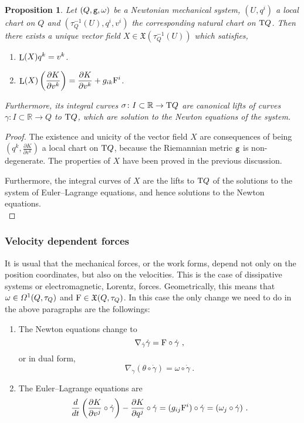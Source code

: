 \documentclass[12pt]{report}
\newtheorem{prop}[teor]{Proposition}
\def\ben{\begin{enumerate}}
\def\een{\end{enumerate}}
\def\dst{\displaystyle}
\def\derpar#1#2{\frac{\partial{#1}}{\partial{#2}}}
\def\qed{\ifvmode\removelastskip\fi
{\unskip\nobreak\hfil\penalty50\hbox{}\nobreak\hfil
\hbox{\vrule height1.2ex width1.2ex}\parfillskip=0pt
\finalhyphendemerits=0 \par\smallskip}}
\def\vf{\mathfrak X}
\def\df{{\mit\Omega}}
\def\Real{\mathbb{R}}
\def\Tan{{\rm T}}
\def\Lie{\mathop{\rm L}\nolimits}
\begin{document}
\begin{prop}
Let $(Q,{\tt g},\omega)$ be a Newtonian mechanical system, $(U,q^i)$ a local chart on $Q$ and $(\tau_Q^{-1}(U), q^i,v^i)$ the corresponding natural chart on $\Tan Q$.
Then there exists a unique vector field $X\in\vf(\tau_Q^{-1}(U))$
which satisfies,
\ben
\item
$\Lie(X)q^k=v^k$.
\item
\(\dst \Lie(X)\left(\derpar{K}{v^k}\right) =
\derpar{K}{v^k}+g_{ik}{\rm F}^i\).
\een
Furthermore, its integral curves $\sigma\colon I\subset\Real\to \Tan Q$
 are canonical lifts  of curves
$\gamma\colon I\subset\Real\to Q$ to $\Tan Q$, 
which are solution to the Newton equations of the system.
\label{cvXY}
\end{prop}
\begin{proof}
The existence and unicity of the vector field  $X$ are consequences of being
\(\dst\left( q^k,\derpar{K}{v^k}\right)\) a local chart on $\Tan Q$,
because the Riemannian metric ${\tt g}$ is non-degenerate.
The properties of  $X$ have been proved in the previous discussion.

Furthermore, the integral curves of $X$ are the lifts to $\Tan Q$ of the solutions to the system of Euler--Lagrange equations, 
and hence solutions to the Newton equations.
\\ \qed \end{proof}


\subsubsection{Velocity dependent forces}
\label{vdf}


It is usual that the mechanical forces, or the work forms, depend 
not only on the position coordinates, but also on the velocities. 
This is the case of dissipative systems or electromagnetic, Lorentz, forces. 
Geometrically, this means that 
$\omega\in\df^1(Q,\tau_Q)$ and ${\rm F}\in\vf (Q,\tau_Q)$. 
In this case the only change we need to do in the above paragraphs are the followings:
\ben
\item
The Newton equations change to
$$
\nabla_{\dot\gamma}\dot\gamma={\rm F}\circ\dot\gamma \ ,
$$
or in dual form,
$$
\nabla_{\dot\gamma}(\theta\circ\dot\gamma)=\omega\circ\dot\gamma \ .
$$
\item
The Euler--Lagrange equations are
$$
\frac{d}{d t}\left(\derpar{K}{v^j}\circ\dot\gamma\right)-
\derpar{K}{q^j}\circ\dot\gamma=(g_{ij}{\rm F}^i)\circ\dot\gamma=
(\omega_j\circ\dot\gamma) \ .
$$
\een
\end{document}
